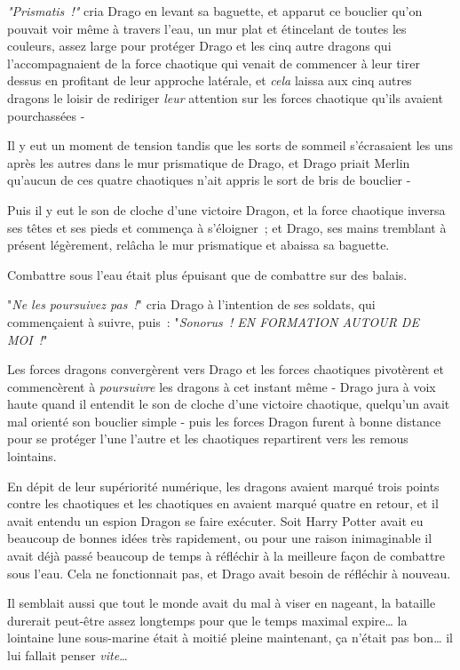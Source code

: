 \emph{"Prismatis~!"} cria Drago en levant sa baguette, et apparut ce bouclier qu'on pouvait voir même à travers l'eau, un mur plat et étincelant de toutes les couleurs, assez large pour protéger Drago et les cinq autre dragons qui l'accompagnaient de la force chaotique qui venait de commencer à leur tirer dessus en profitant de leur approche latérale, et \emph{cela} laissa aux cinq autres dragons le loisir de rediriger \emph{leur} attention sur les forces chaotique qu'ils avaient pourchassées -

Il y eut un moment de tension tandis que les sorts de sommeil s'écrasaient les uns après les autres dans le mur prismatique de Drago, et Drago priait Merlin qu'aucun de ces quatre chaotiques n'ait appris le sort de bris de bouclier -

Puis il y eut le son de cloche d'une victoire Dragon, et la force chaotique inversa ses têtes et ses pieds et commença à s'éloigner~; et Drago, ses mains tremblant à présent légèrement, relâcha le mur prismatique et abaissa sa baguette.

Combattre sous l'eau était plus épuisant que de combattre sur des balais.

"\emph{Ne les poursuivez pas~!}" cria Drago à l'intention de ses soldats, qui commençaient à suivre, puis~: "\emph{Sonorus~! EN FORMATION AUTOUR DE MOI~!}"

Les forces dragons convergèrent vers Drago et les forces chaotiques pivotèrent et commencèrent à \emph{poursuivre} les dragons à cet instant même - Drago jura à voix haute quand il entendit le son de cloche d'une victoire chaotique, quelqu'un avait mal orienté son bouclier simple - puis les forces Dragon furent à bonne distance pour se protéger l'une l'autre et les chaotiques repartirent vers les remous lointains.

En dépit de leur supériorité numérique, les dragons avaient marqué trois points contre les chaotiques et les chaotiques en avaient marqué quatre en retour, et il avait entendu un espion Dragon se faire exécuter. Soit Harry Potter avait eu beaucoup de bonnes idées très rapidement, ou pour une raison inimaginable il avait déjà passé beaucoup de temps à réfléchir à la meilleure façon de combattre sous l'eau. Cela ne fonctionnait pas, et Drago avait besoin de réfléchir à nouveau.

Il semblait aussi que tout le monde avait du mal à viser en nageant, la bataille durerait peut-être assez longtemps pour que le temps maximal expire… la lointaine lune sous-marine était à moitié pleine maintenant, ça n'était pas bon… il lui fallait penser \emph{vite}…

